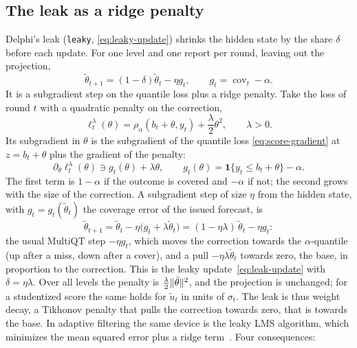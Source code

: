 \documentclass[11pt,a4paper]{article}
\newcommand{\ind}{\mathbf{1}}
\DeclareMathOperator{\cov}{cov}
\DeclarePairedDelimiter{\norm}{\lVert}{\rVert}
\theoremstyle{definition}
\theoremstyle{remark}
\begin{document}
\subsection{The leak as a ridge penalty}
\label{sec:leak-ridge}
Delphi's leak (\texttt{leaky}, \eqref{eq:leaky-update}) shrinks the hidden
state by the share $\delta$ before each update. For one level and one
report per round, leaving out the projection,
\begin{equation}
 \tilde\theta_{t+1}=(1-\delta)\tilde\theta_t-\eta g_t,\qquad g_t=\cov_t-\alpha.
 \label{eq:leak-update}
\end{equation}
It is a subgradient step on the quantile loss plus a ridge penalty.
Take the loss of round $t$ with a quadratic penalty on the correction,
\begin{equation}
 \ell_t^\lambda(\theta)=\rho_\alpha(b_t+\theta,y_t)+\frac\lambda2\theta^2,
 \qquad\lambda>0.
 \label{eq:leak-ridge}
\end{equation}
Its subgradient in $\theta$ is the subgradient of the quantile loss
\eqref{eq:score-gradient} at $z=b_t+\theta$ plus the gradient of the
penalty:
\[
 \partial_\theta\ell_t^\lambda(\theta)\ni g_t(\theta)+\lambda\theta,\qquad
 g_t(\theta)=\ind\{y_t\le b_t+\theta\}-\alpha .
\]
The first term is $1-\alpha$ if the outcome is covered and $-\alpha$ if not;
the second grows with the size of the correction. A subgradient step of
size $\eta$ from the hidden state, with $g_t=g_t(\tilde\theta_t)$ the
coverage error of the issued forecast, is
\[
 \tilde\theta_{t+1}=\tilde\theta_t-\eta\bigl(g_t+\lambda\tilde\theta_t\bigr)
 =(1-\eta\lambda)\,\tilde\theta_t-\eta g_t :
\]
the usual MultiQT step $-\eta g_t$, which moves the correction towards the
$\alpha$-quantile (up after a miss, down after a cover), and a pull
$-\eta\lambda\tilde\theta_t$ towards zero, the base, in proportion to the
correction. This is the leaky update~\eqref{eq:leak-update} with
$\delta=\eta\lambda$. Over all levels the penalty is $\frac\lambda2\norm{\tilde\theta}^2$, and
the projection is unchanged; for a studentized score the same holds for
$\tilde u_t$ in units of $\sigma_t$. The leak is thus weight decay, a
Tikhonov penalty that pulls the correction towards zero, that is towards
the base. In adaptive filtering the same device is the leaky LMS
algorithm, which minimizes the mean squared error plus a ridge
term~\cite{leaky-lms}. Four consequences:
\end{document}
